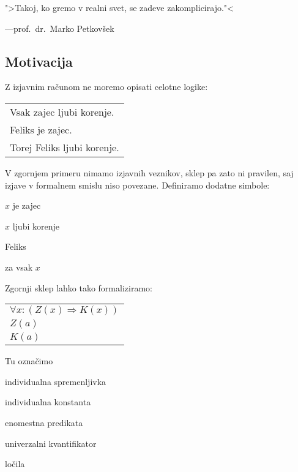 \documentclass[12pt, a4paper]{article}
\renewcommand{\implies}{\Rightarrow}
\begin{document}
\epigraph{">Takoj, ko gremo v realni svet, se zadeve zakomplicirajo."<}{---prof.~dr.~Marko Petkovšek}

\subsection{Motivacija}

\begin{zgled}
Z izjavnim računom ne moremo opisati celotne logike:

\begin{tabular}{l}
Vsak zajec ljubi korenje.\\
Feliks je zajec.\\
\hline
Torej Feliks ljubi korenje.
\end{tabular}

V zgornjem primeru nimamo izjavnih veznikov, sklep pa zato ni pravilen, saj izjave v formalnem smislu niso povezane. Definiramo dodatne simbole:

\begin{description}[labelwidth=1.5cm]
\item[$Z(x)$] $x$ je zajec
\item[$K(x)$] $x$ ljubi korenje
\item[$a$] Feliks
\item[$\forall x$] za vsak $x$
\end{description}

Zgornji sklep lahko tako formaliziramo:

\begin{tabular}{l}
$\forall x\colon(Z(x)\implies K(x))$\\
$Z(a)$\\
\hline
$K(a)$
\end{tabular}

Tu označimo

\begin{description}[labelwidth=1cm]
\item[$x$] individualna spremenljivka
\item[$a$] individualna konstanta
\item[$Z,K$] enomestna predikata
\item[$\forall x$] univerzalni kvantifikator
\item[$\colon()$] ločila
\end{description}
\end{zgled}
\end{document}
